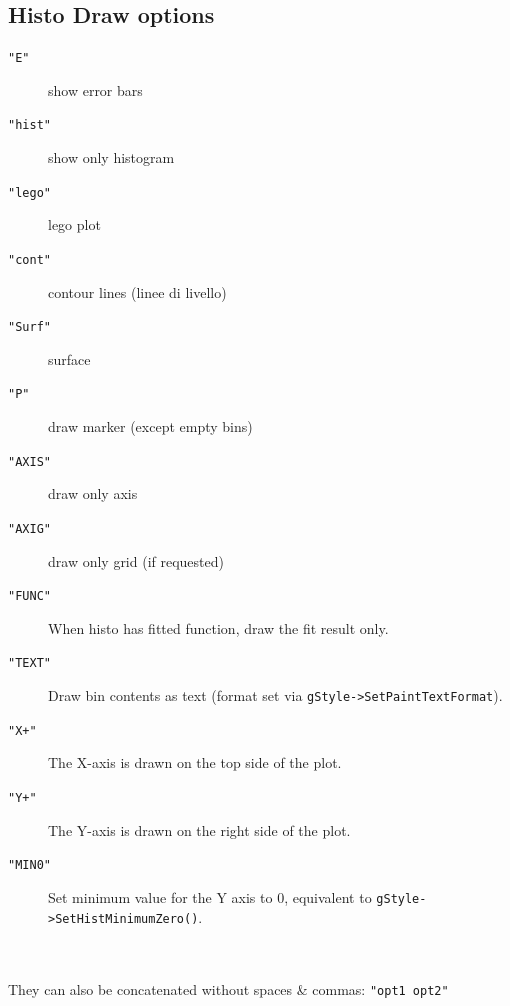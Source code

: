\documentclass[10pt, oneside]{article}
\begin{document}
\subsection{Histo Draw options}
\begin{description}
\item[\texttt{"E"}] show error bars
\item[\texttt{"hist"}] show only histogram
\item[\texttt{"lego"}] lego plot
\item[\texttt{"cont"}] contour lines (linee di livello)
\item[\texttt{"Surf"}] surface
\item[\texttt{"P"}] draw marker (except empty bins)
\item[\texttt{"AXIS"}] draw only axis
\item[\texttt{"AXIG"}] draw only grid (if requested)
\item[\texttt{"FUNC"}]	When histo has fitted function, draw the fit result only.
\item[\texttt{"TEXT"}]	Draw bin contents as text (format set via 
\texttt{gStyle->SetPaintTextFormat}).
\item[\texttt{"X+"}]	The X-axis is drawn on the top side of the plot.
\item[\texttt{"Y+"}]	The Y-axis is drawn on the right side of the plot.
\item[\texttt{"MIN0"}] Set minimum value for the Y axis to $0$, equivalent to \texttt{gStyle->SetHistMinimumZero()}.
\end{description}
\\~\\They can also be concatenated without spaces \& commas: \texttt{"opt1 opt2"}
\end{document}
